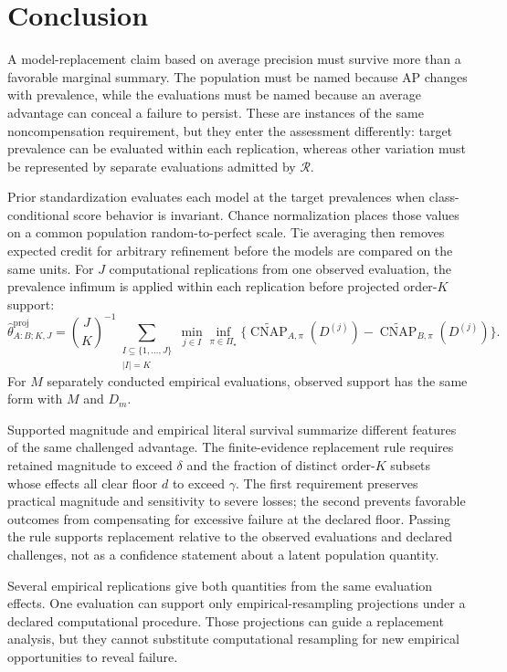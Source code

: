 \documentclass[11pt]{article}
\newcommand{\CNAP}{\operatorname{CNAP}}
\newcommand{\Regime}{\mathcal{R}}
\newcommand{\PSet}{\Pi_\star}
\newcommand{\CNAPta}{\widetilde{\CNAP}}
\theoremstyle{remark}
\begin{document}
\section{Conclusion}

A model-replacement claim based on average precision must survive more than a favorable marginal summary. The population must be named because AP changes with prevalence, while the evaluations must be named because an average advantage can conceal a failure to persist. These are instances of the same noncompensation requirement, but they enter the assessment differently: target prevalence can be evaluated within each replication, whereas other variation must be represented by separate evaluations admitted by $\Regime$.

Prior standardization evaluates each model at the target prevalences when class-conditional score behavior is invariant. Chance normalization places those values on a common population random-to-perfect scale. Tie averaging then removes expected credit for arbitrary refinement before the models are compared on the same units. For $J$ computational replications from one observed evaluation, the prevalence infimum is applied within each replication before projected order-$K$ support:
\[
\widehat\theta_{A:B;K,J}^{\mathrm{proj}}
=
\binom{J}{K}^{-1}
\sum_{\substack{I\subseteq\{1,\ldots,J\}\\|I|=K}}
\min_{j\in I}
\inf_{\pi\in\PSet}
\{\CNAPta_{A,\pi}(D^{(j)})-\CNAPta_{B,\pi}(D^{(j)})\}.
\]
For $M$ separately conducted empirical evaluations, observed support has the same form with $M$ and $D_m$.

Supported magnitude and empirical literal survival summarize different features
of the same challenged advantage. The finite-evidence replacement rule requires
retained magnitude to exceed $\delta$ and the fraction of distinct order-$K$
subsets whose effects all clear floor $d$ to exceed $\gamma$. The first
requirement preserves practical magnitude and sensitivity to severe losses;
the second prevents favorable outcomes from compensating for excessive failure
at the declared floor. Passing the rule supports replacement relative to the
observed evaluations and declared challenges, not as a confidence statement
about a latent population quantity.

Several empirical replications give both quantities from the same evaluation effects. One evaluation can support only empirical-resampling projections under a declared computational procedure. Those projections can guide a replacement analysis, but they cannot substitute computational resampling for new empirical opportunities to reveal failure.
\end{document}
